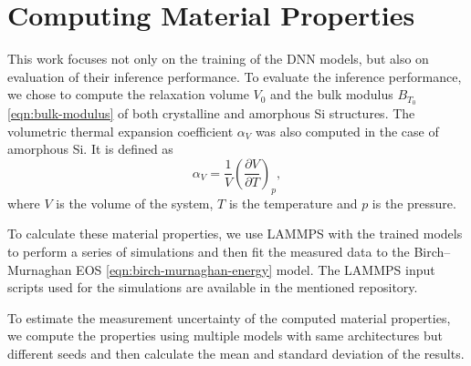 \section{Computing Material Properties}

This work focuses not only on the training of the DNN models, but also on
evaluation of their inference performance. To evaluate the inference
performance, we chose to compute the relaxation volume $V_0$ and the bulk
modulus $B_{T_0}$ \eqref{eqn:bulk-modulus} of both crystalline and amorphous
Si structures. The volumetric thermal expansion coefficient $\alpha_V$ was
also computed in the case of amorphous Si. It is defined as
\begin{equation}
  \alpha_V = \frac{1}{V} \left( \frac{\partial V}{\partial T} \right)_p,
\end{equation}
where $V$ is the volume of the system, $T$ is the temperature and $p$ is the
pressure.

To calculate these material properties, we use LAMMPS with the trained models
to perform a series of simulations and then fit the measured data to the
Birch--Murnaghan EOS \eqref{eqn:birch-murnaghan-energy} model. The LAMMPS
input scripts used for the simulations are available in the mentioned
repository.

To estimate the measurement uncertainty of the computed material properties,
we compute the properties using multiple models with same architectures but
different seeds and then calculate the mean and standard deviation of the
results.

